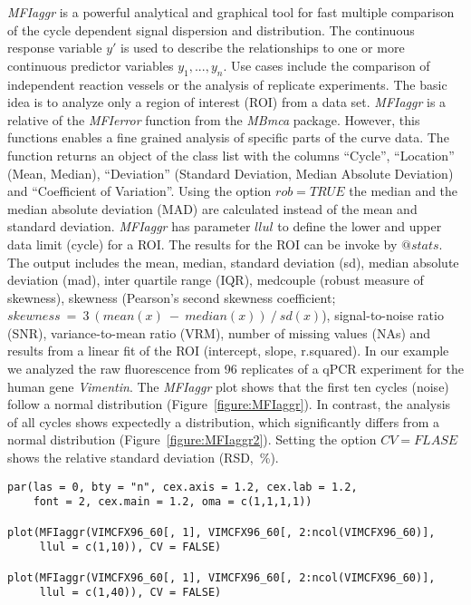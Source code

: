 \documentclass[twocolumn]{bmcart}%
\begin{document}
 \textsl{MFIaggr} is a powerful analytical and graphical tool for fast multiple 
comparison of the cycle dependent signal dispersion and distribution. The 
continuous response variable $y'$ is used to describe the relationships to one 
or more continuous predictor variables $y_1, ..., y_n$. Use cases include the 
comparison of independent reaction vessels or the analysis of replicate 
experiments. The basic idea is to analyze only a region of interest (ROI) from 
a 
data set. \textsl{MFIaggr} is a relative of the \textsl{MFIerror} function from 
the \emph{MBmca} package. However, this functions enables a fine grained 
analysis of specific parts of the curve data. The function returns an object of 
the class list with the columns ``Cycle'', ``Location'' (Mean, Median), 
``Deviation'' (Standard Deviation, Median Absolute Deviation) and ``Coefficient 
of Variation''. Using the option $rob = TRUE$ the median and the median 
absolute 
deviation (MAD) are calculated instead of the mean and standard deviation. 
\textsl{MFIaggr} has parameter $llul$ to define the lower and upper data limit 
(cycle) for a ROI. The results for the ROI can be invoke by $@stats$. The 
output 
includes the mean, median, standard deviation (sd), median absolute deviation 
(mad), inter quartile range (IQR), medcouple (robust measure of skewness), 
skewness (Pearson's second skewness coefficient; 
$skewness~=~3~(mean(x)~-~median(x))~/~sd(x)$), signal-to-noise ratio (SNR), 
variance-to-mean ratio (VRM), number of missing values (NAs) and results from a 
linear fit of the ROI (intercept, slope, r.squared). In our example we analyzed 
the raw fluorescence from 96 replicates of a qPCR experiment for the human gene 
\textit{Vimentin}. The \textsl{MFIaggr} plot shows that the first ten cycles 
(noise) follow a normal distribution (Figure~\ref{figure:MFIaggr}). In 
contrast, 
the analysis of all cycles shows expectedly a distribution, which significantly 
differs from a normal distribution (Figure~\ref{figure:MFIaggr2}). Setting the 
option $CV = FLASE$ shows the relative standard deviation (RSD,~\%).

\begin{figure*}
\begin{verbatim}
par(las = 0, bty = "n", cex.axis = 1.2, cex.lab = 1.2, 
    font = 2, cex.main = 1.2, oma = c(1,1,1,1))

plot(MFIaggr(VIMCFX96_60[, 1], VIMCFX96_60[, 2:ncol(VIMCFX96_60)], 
     llul = c(1,10)), CV = FALSE)

plot(MFIaggr(VIMCFX96_60[, 1], VIMCFX96_60[, 2:ncol(VIMCFX96_60)], 
     llul = c(1,40)), CV = FALSE)
\end{verbatim}
\end{figure*}
\end{document}
